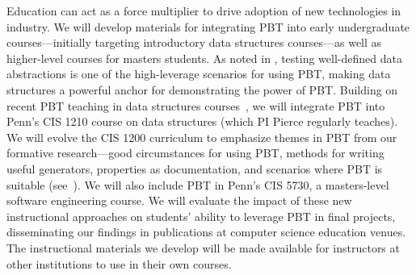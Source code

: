 %
Education can act as a force multiplier to drive adoption of new
technologies in industry.
We will develop materials for
integrating PBT into early undergraduate courses---initially targeting
introductory data structures
courses---as well as higher-level courses for masters students. As noted in , testing well-defined data
abstractions is one of the high-leverage scenarios for using PBT, making data
structures a powerful anchor for demonstrating the power of PBT.
%
Building on
recent PBT teaching in data structures
courses~\cite{wrenn2021using,nelson2021automated}, we will integrate PBT into
Penn's CIS 1210 course on data structures (which PI Pierce regularly teaches).
%
We
will evolve the CIS 1200 curriculum to emphasize themes in PBT from our
formative research---good circumstances for
using PBT, methods for writing useful generators, properties as
documentation, and scenarios where PBT is suitable
(see~).
%
We will also include PBT in Penn's CIS 5730, a masters-level software engineering
course.
%
We will evaluate the impact of these new
instructional approaches on students' ability to leverage PBT in final projects,
disseminating our findings in publications at computer science
education venues.
%
The instructional materials we develop will be made available for instructors at
other institutions to use in their own courses.



\immediate\closeout\workplanfile



